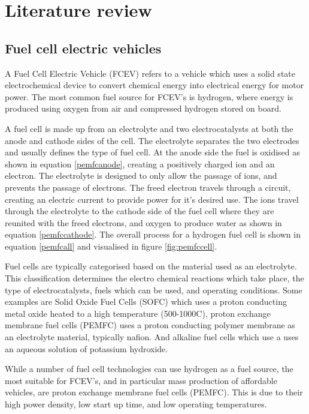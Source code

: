 
\chapter{Literature review}

\section{Fuel cell electric vehicles}
A Fuel Cell Electric Vehicle (FCEV) refers to a vehicle which uses a solid state electrochemical device to convert chemical energy into electrical energy for motor power. The most common fuel source for FCEV's is hydrogen, where energy is produced using oxygen from air and compressed hydrogen stored on board. 

A fuel cell is made up from an electrolyte and two electrocatalysts at both the anode and cathode sides of the cell. The electrolyte separates the two electrodes and usually defines the type of fuel cell. At the anode side the fuel is oxidised as shown in equation \ref{pemfcanode}, creating a positively charged ion and an electron. The electrolyte is designed to only allow the passage of ions, and prevents the passage of electrons. The freed electron travels through a circuit, creating an electric current to provide power for it's desired use. The ions travel through the electrolyte to the cathode side of the fuel cell where they are reunited with the freed electrons, and oxygen to produce water as shown in equation \ref{pemfccathode}. The overall process for a hydrogen fuel cell is shown in equation \ref{pemfcall} and visualised in figure \ref{fig:pemfccell}. 

Fuel cells are typically categorised based on the material used as an electrolyte. This classification determines the electro chemical reactions which take place, the type of electrocatalysts, fuels which can be used, and operating conditions. Some examples are Solid Oxide Fuel Cells (SOFC) which uses a proton conducting metal oxide heated to a high temperature (500-1000\textdegree C), proton exchange membrane fuel cells (PEMFC) uses a proton conducting polymer membrane as an electrolyte material, typically nafion. And alkaline fuel cells which use a uses an aqueous solution of potassium hydroxide.  

While a number of fuel cell technologies can use hydrogen as a fuel source, the most suitable for FCEV's, and in particular mass production of affordable vehicles, are proton exchange membrane fuel cells (PEMFC). This is due to their high power density, low start up time, and low operating temperatures. \cite{Alaswad2016}

